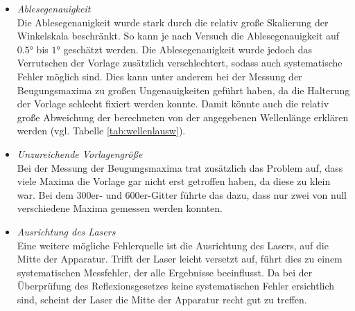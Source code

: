 \begin{itemize}
    \item \textit{Ablesegenauigkeit}
    \\\noindent
        Die Ablesegenauigkeit wurde stark durch die relativ große Skalierung der Winkelskala beschränkt.
        So kann je nach Versuch die Ablesegenauigkeit auf $\num{0.5}°$ bis $\num{1}°$ geschätzt werden.
        Die Ablesegenauigkeit wurde jedoch das Verrutschen der Vorlage zusätzlich verschlechtert, sodass
        auch systematische Fehler möglich sind. Dies kann unter anderem bei der Messung der Beugungsmaxima
        zu großen Ungenauigkeiten geführt haben, da die Halterung der Vorlage schlecht fixiert werden konnte.
        Damit könnte auch die relativ große Abweichung der berechneten von der angegebenen Wellenlänge
        erklären werden (vgl. Tabelle \ref{tab:wellenlausw}).
    \item \textit{Unzureichende Vorlagengröße}
    \\\noindent
        Bei der Messung der Beugungsmaxima trat zusätzlich das Problem auf, dass viele Maxima die Vorlage
        gar nicht erst getroffen haben, da diese zu klein war. Bei dem 300er- und 600er-Gitter führte das dazu,
        dass nur zwei von null verschiedene Maxima gemessen werden konnten.
    \item \textit{Ausrichtung des Lasers}
    \\\noindent
        Eine weitere mögliche Fehlerquelle ist die Ausrichtung des Lasers, auf die Mitte der Apparatur. Trifft
        der Laser leicht versetzt auf, führt dies zu einem systematischen Messfehler, der alle Ergebnisse
        beeinflusst. Da bei der Überprüfung des Reflexionsgesetzes keine systematischen Fehler ersichtlich sind,
        scheint der Laser die Mitte der Apparatur recht gut zu treffen.
\end{itemize}
